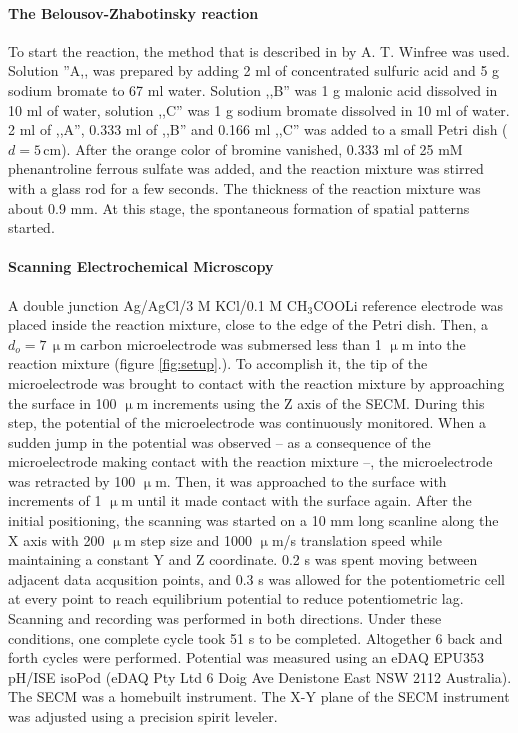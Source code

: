 \documentclass[3p, twocolumn]{elsarticle}
\begin{document}
\paragraph{The Belousov-Zhabotinsky reaction} 
To start the reaction, the method that is described in \cite{winfree} by A. T. Winfree was used.
Solution ''A,, was prepared by adding 2 ml of concentrated sulfuric acid and 5 g sodium bromate to 67 ml water.
Solution ,,B'' was 1 g malonic acid dissolved in 10 ml of water, solution ,,C'' was 1 g sodium bromate dissolved in 10 ml of water.
2 ml of ,,A'', 0.333 ml of ,,B'' and 0.166 ml ,,C'' was added to a small Petri dish ($d=5 \,$cm).
After the orange color of bromine vanished, 0.333 ml of 25 mM phenantroline ferrous sulfate was added, and the reaction mixture was stirred with a glass rod for a few seconds.
The thickness of the reaction mixture was about 0.9 mm.
At this stage, the spontaneous formation of spatial patterns started.

\paragraph{Scanning Electrochemical Microscopy} A double junction Ag/AgCl/3 M KCl/0.1 M CH$_3$COOLi reference electrode was placed inside the reaction mixture, close to the edge of the Petri dish.
Then, a $d_o=7\, \upmu$m carbon microelectrode was submersed less than 1 $\upmu$m into the reaction mixture (figure \ref{fig:setup}.).
To accomplish it, the tip of the microelectrode was brought to contact with the reaction mixture by approaching the surface in 100 $\upmu$m increments using the Z axis of the SECM.
During this step, the potential of the microelectrode was continuously monitored.
When a sudden jump in the potential was observed -- as a consequence of the microelectrode making contact with the reaction mixture --, the microelectrode was retracted by 100 $\upmu$m.
Then, it was approached to the surface with increments of 1 $\upmu$m until it made contact with the surface again.
After the initial positioning, the scanning was started on a 10 mm long scanline along the X axis with 200 $\upmu$m step size and 1000 $\upmu$m/s translation speed while maintaining a constant Y and Z coordinate.
0.2 s was spent moving between adjacent data acqusition points, and 0.3 s was allowed for the potentiometric cell at every point to reach equilibrium potential to reduce potentiometric lag.
Scanning and recording was performed in both directions.
Under these conditions, one complete cycle took 51 s to be completed.
Altogether 6 back and forth cycles were performed.
Potential was measured using an eDAQ EPU353 pH/ISE isoPod (eDAQ Pty Ltd 6 Doig Ave Denistone East NSW 2112 Australia).
The SECM was a homebuilt instrument.
The X-Y plane of the SECM instrument was adjusted using a precision spirit leveler.
\end{document}
